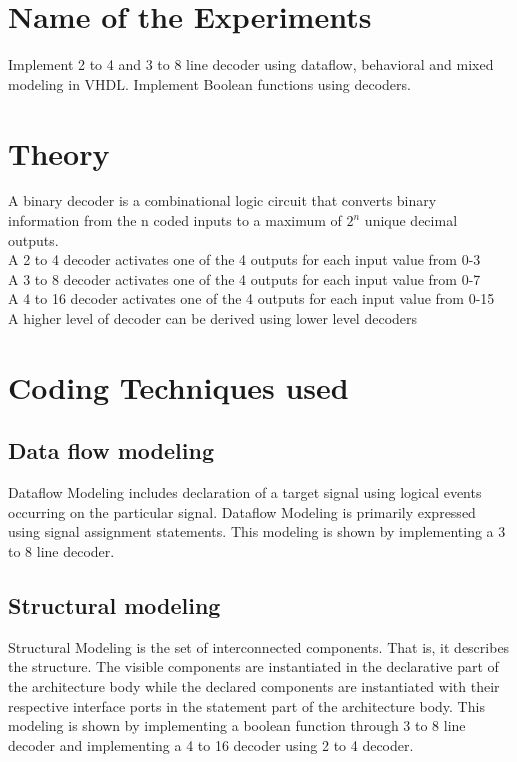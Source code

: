 \section{Name of the Experiments}
Implement  2 to 4 and 3 to 8 line decoder using dataflow, behavioral and mixed modeling in VHDL. Implement Boolean functions using decoders.\\


 

\section{Theory}

A binary decoder is a combinational logic circuit that converts binary information from the n coded inputs to a maximum of $2^{n}$ unique decimal outputs.\\
A 2 to 4 decoder activates one of the 4 outputs for each input value from 0-3\\
A 3 to 8 decoder activates one of the 4 outputs for each input value from 0-7\\
A 4 to 16 decoder activates one of the 4 outputs for each input value from 0-15\\

A higher level of decoder can be derived using lower level decoders


\clearpage

\section{Coding Techniques used}
\subsection{Data flow modeling}

Dataflow Modeling includes declaration of a target signal using logical events occurring on the particular signal. Dataflow Modeling is primarily expressed using signal assignment statements.
This modeling is shown by implementing a 3 to 8 line decoder. 


\subsection{Structural modeling }
Structural Modeling is the set of interconnected components. That is, it describes the structure. The visible components are instantiated in the declarative part of the architecture body while the declared components are instantiated with their respective interface ports in the statement part of the architecture body.
This modeling is shown by implementing a boolean function through 3 to 8 line decoder and implementing a 4 to 16 decoder using 2 to 4 decoder.

